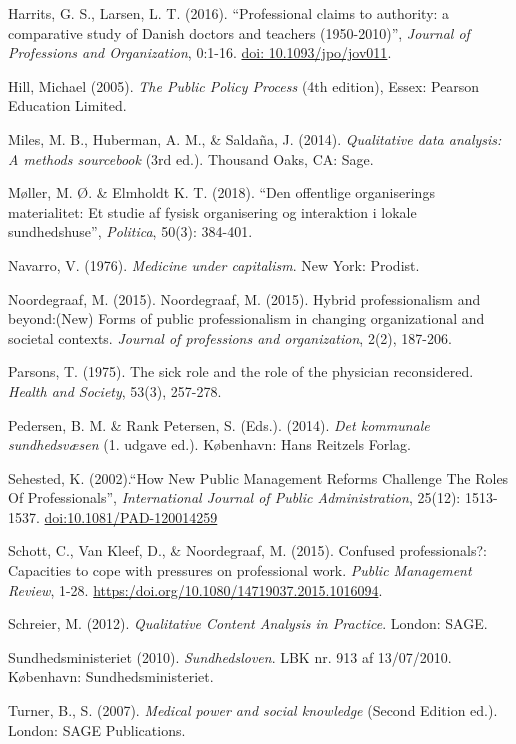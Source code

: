 \begin{thebibliography}{99}
\item Harrits, G. S., Larsen, L. T. (2016). “Professional claims to authority: a comparative study of Danish doctors and teachers (1950-2010)”, \textit{Journal of Professions and Organization}, 0:1-16. \url{doi: 10.1093/jpo/jov011}.
\item Hill, Michael (2005). \textit{The Public Policy Process} (4th edition), Essex: Pearson Education Limited.
\item Miles, M. B., Huberman, A. M., \& Saldaña, J. (2014). \textit{Qualitative data analysis: A methods sourcebook} (3rd ed.). Thousand Oaks, CA: Sage. 
\item Møller, M. Ø. \& Elmholdt K. T. (2018). “Den offentlige organiserings materialitet: Et studie af fysisk organisering og interaktion i lokale sundhedshuse”, \textit{Politica}, 50(3): 384-401. 
\item Navarro, V. (1976). \textit{Medicine under capitalism}. New York: Prodist. 
\item Noordegraaf, M. (2015). Noordegraaf, M. (2015). Hybrid professionalism and beyond:(New) Forms of public professionalism in changing organizational and societal contexts. \textit{Journal of professions and organization}, 2(2), 187-206.
\item Parsons, T. (1975). The sick role and the role of the physician reconsidered. \textit{Health and Society}, 53(3), 257-278.
\item Pedersen, B. M. \& Rank Petersen, S. (Eds.). (2014). \textit{Det kommunale sundhedsvæsen} (1. udgave ed.). København: Hans Reitzels Forlag.
\item Sehested, K. (2002).“How New Public Management Reforms Challenge The Roles Of Professionals”, \textit{International Journal of Public Administration}, 25(12): 1513-1537. \url{doi:10.1081/PAD-120014259}
\item Schott, C., Van Kleef, D., \& Noordegraaf, M. (2015). Confused professionals?: Capacities to cope with pressures on professional work. \textit{Public Management Review}, 1-28. \url{https:/doi.org/10.1080/14719037.2015.1016094}.
\item Schreier, M. (2012). \textit{Qualitative Content Analysis in Practice}. London: SAGE.
\item Sundhedsministeriet (2010). \textit{Sundhedsloven}. LBK nr. 913 af 13/07/2010. København: Sundhedsministeriet.
\item Turner, B., S. (2007). \textit{Medical power and social knowledge} (Second Edition ed.). London: SAGE Publications. 

\end{thebibliography}